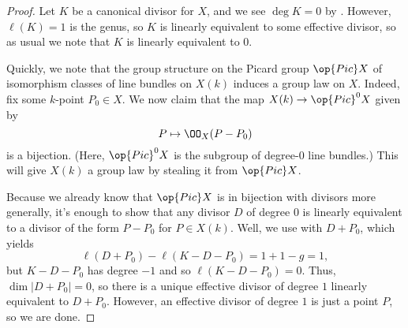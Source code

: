 \documentclass[../notes.tex]{subfiles}
\begin{document}
\begin{proof}
	Let $K$ be a canonical divisor for $X$, and we see $\deg K=0$ by . However, $\ell(K)=1$ is the genus, so $K$ is linearly equivalent to some effective divisor, so as usual we note that $K$ is linearly equivalent to $0$.

	Quickly, we note that the group structure on the Picard group $\op{Pic}X$ of isomorphism classes of line bundles on $X(k)$ induces a group law on $X$. Indeed, fix some $k$-point $P_0\in X$. We now claim that the map $X(k)\to\op{Pic}^0X$ given by
	\[P\mapsto\OO_X(P-P_0)\]
	is a bijection. (Here, $\op{Pic}^0X$ is the subgroup of degree-$0$ line bundles.) This will give $X(k)$ a group law by stealing it from $\op{Pic}X$.
	
	Because we already know that $\op{Pic}X$ is in bijection with divisors more generally, it's enough to show that any divisor $D$ of degree $0$ is linearly equivalent to a divisor of the form $P-P_0$ for $P\in X(k)$. Well, we use  with $D+P_0$, which yields
	\[\ell(D+P_0)-\ell(K-D-P_0)=1+1-g=1,\]
	but $K-D-P_0$ has degree $-1$ and so $\ell(K-D-P_0)=0$. Thus, $\dim|D+P_0|=0$, so there is a unique effective divisor of degree $1$ linearly equivalent to $D+P_0$. However, an effective divisor of degree $1$ is just a point $P$, so we are done.
\end{proof}
\end{document}
